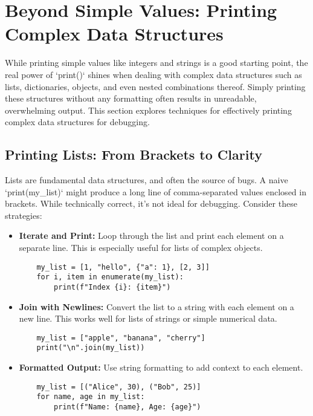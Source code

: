 \documentclass{article}
\begin{document}
\section*{Beyond Simple Values: Printing Complex Data Structures}

While printing simple values like integers and strings is a good starting point, the real power of `print()` shines when dealing with complex data structures such as lists, dictionaries, objects, and even nested combinations thereof. Simply printing these structures without any formatting often results in unreadable, overwhelming output. This section explores techniques for effectively printing complex data structures for debugging.

\subsection*{Printing Lists: From Brackets to Clarity}

Lists are fundamental data structures, and often the source of bugs. A naive `print(my_list)` might produce a long line of comma-separated values enclosed in brackets. While technically correct, it's not ideal for debugging. Consider these strategies:

\begin{itemize}
    \item \textbf{Iterate and Print:} Loop through the list and print each element on a separate line. This is especially useful for lists of complex objects.

    \begin{verbatim}
    my_list = [1, "hello", {"a": 1}, [2, 3]]
    for i, item in enumerate(my_list):
        print(f"Index {i}: {item}")
    \end{verbatim}

    \item \textbf{Join with Newlines:} Convert the list to a string with each element on a new line.  This works well for lists of strings or simple numerical data.

    \begin{verbatim}
    my_list = ["apple", "banana", "cherry"]
    print("\n".join(my_list))
    \end{verbatim}

    \item \textbf{Formatted Output:} Use string formatting to add context to each element.

    \begin{verbatim}
    my_list = [("Alice", 30), ("Bob", 25)]
    for name, age in my_list:
        print(f"Name: {name}, Age: {age}")
    \end{verbatim}
\end{itemize}
\end{document}
